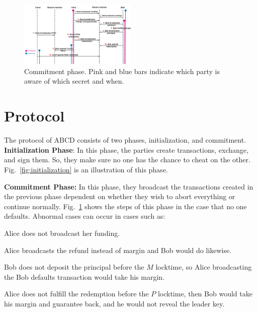 \documentclass[conference,compsoc]{IEEEtran}
\begin{document}
\begin{figure}
\centering
\includegraphics[width=0.5\textwidth]{ABCDarrows-3.pdf}
\caption{Commitment phase. Pink and blue bars indicate which party is aware of which secret and when.}
\label{fig:commitment}
\end{figure}
\section{Protocol}
The protocol of ABCD consists of two phases, initialization, and commitment.\\
\textbf{Initialization Phase}:
In this phase, the parties create transactions, exchange, and sign them. So, they make sure no one has the chance to cheat on the other. Fig.~\ref{fig:initialization} is an illustration of this phase. %


\textbf{Commitment Phase:}
In this phase, they broadcast the transactions created in the previous phase dependent on whether they wish to abort everything or continue normally. Fig.~\ref{fig:commitment} shows the steps of this phase in the case that no one defaults.
Abnormal cases can occur in cases such as:
\begin{enumerate*}
    \item Alice does not broadcast her funding.
    \item Alice broadcasts the refund instead of margin and Bob would do likewise.
    \item Bob does not deposit the principal before the $M$ locktime, so Alice broadcasting the Bob defaults transaction would take his margin.
    \item Alice does not fulfill the redemption before the $P$ locktime, then Bob would take his margin and guarantee back, and he would not reveal the leader key.
\end{enumerate*}
\end{document}
